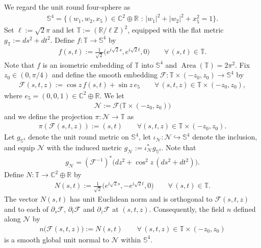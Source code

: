 \documentclass[a4paper,11pt,oneside,reqno]{amsart}
\numberwithin{equation}{section}
\theoremstyle{definition}
\begin{document}
We regard the unit round four-sphere as
%
\begin{align*}
    \mathbb{S}^4=\{(w_1,w_2,x_5)\in\mathbb{C}^2\oplus\mathbb{R}\mbox{ : }|w_1|^2+|w_2|^2+x_5^2=1\}.
\end{align*}
%
Set $\ell:=\sqrt2\pi$ and let $\mathbb{T}:=(\mathbb{R}/\ell\mathbb{Z})^2$, equipped with the flat metric $g_{\mathbb{T}}:=ds^2+dt^2$. Define $f:\mathbb{T}\to\mathbb{S}^4$ by
%
\begin{align}
    \label{eq:s4-clifford-frame}
    f(s,t):=\frac{1}{\sqrt{2}}
    \bigl(e^{i\sqrt{2}s},e^{i\sqrt{2}t},0\bigr) \qquad\forall\,(s,t)\in\mathbb{T}.
\end{align}
%
Note that $f$ is an isometric embedding of $\mathbb{T}$ into $\mathbb{S}^4$ and $\operatorname{Area}(\mathbb{T})=2\pi^2$. Fix $z_0\in(0,\pi/4)$ and define the smooth embedding $\mathcal F:\mathbb{T}\times(-z_0,z_0)\to\mathbb{S}^4$ by
%
\begin{align}
    \label{eq:s4-suspension}
    \mathcal{F}(s,t,z):=\cos z\,f(s,t)+\sin z\,e_5 \qquad\forall\,(s,t,z)\in\mathbb{T}\times(-z_0,z_0),
\end{align}
%
where $e_5=(0,0,1)\in\mathbb{C}^2\oplus\mathbb{R}$. We let 
%
\begin{align*}
    \mathcal{N}:=\mathcal{F}\bigl(\mathbb{T}\times(-z_0,z_0)\bigr)
\end{align*}
%
and we define the projection $\pi:\mathcal{N}\to\mathbb{T}$ as
%
\begin{align*}
    \pi(\mathcal{F}(s,t,z)):=(s,t) \qquad\forall(s,t,z)\in\mathbb{T}\times(-z_0,z_0).
\end{align*}
%
Let $g_{\mathbb{S}^4}$ denote the unit round metric on $\mathbb{S}^4$,
let $\iota_{\mathcal{N}}:\mathcal{N}\hookrightarrow\mathbb{S}^4$
denote the inclusion, and equip $\mathcal{N}$ with the induced
metric $g_{\mathcal{N}}:=\iota_{\mathcal{N}}^*g_{\mathbb{S}^4}$.
Note that 
%
\begin{align}
    \label{eq:s4-suspension-metric}
    g_{\mathcal{N}}=(\mathcal{F}^{-1})^*\bigl(dz^2+\cos^2z\,(ds^2+dt^2)\bigr).
\end{align}
%
Define $N:\mathbb{T}\to\mathbb{C}^2\oplus\mathbb{R}$ by
%
\begin{align*}
    N(s,t):=\frac{1}{\sqrt{2}}\bigl(e^{i\sqrt{2}s},-e^{i\sqrt{2}t},0\bigr)\qquad\forall\,(s,t)\in\mathbb{T}.
\end{align*}
%
The vector $N(s,t)$ has unit Euclidean norm and is orthogonal to $\mathcal{F}(s,t,z)$ and to each of $\partial_s\mathcal{F}$, $\partial_t\mathcal{F}$ and $\partial_z\mathcal{F}$ at $(s,t,z)$. Consequently, the field $n$ defined along $\mathcal{N}$ by
%
\begin{align*}
    n\bigl(\mathcal{F}(s,t,z)\bigr):=N(s,t) \qquad\forall\,(s,t,z)\in\mathbb{T}\times(-z_0,z_0)
\end{align*}
%
is a smooth global unit normal to $\mathcal{N}$ within $\mathbb{S}^4$.
\end{document}
